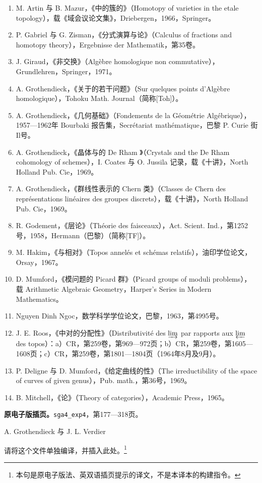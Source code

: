 \begin{enumerate}
\item[{[1]}] M. Artin 与 B. Mazur，《中的簇的》（Homotopy of varieties in the etale topology），载《域会议论文集》，Driebergen，1966，Springer。
\item[{[2]}] P. Gabriel 与 G. Zisman，《分式演算与论》（Calculus of fractions and homotopy theory），Ergebnisse der Mathematik，第35卷。
\item[{[3]}] J. Giraud，《非交换》（Algèbre homologique non commutative），Grundlehren，Springer，1971。
\item[{[4]}] A. Grothendieck，《关于的若干问题》（Sur quelques points d’Algèbre homologique），Tohoku Math. Journal（简称[Toh]）。
\item[{[5]}] A. Grothendieck，《几何基础》（Fondements de la Géométrie Algébrique），1957—1962年 Bourbaki 报告集，Secrétariat mathématique，巴黎 P. Curie 街Il号。
\item[{[6]}] A. Grothendieck，《晶体与的 De Rham 》（Crystals and the De Rham cohomology of schemes），I. Coates 与 O. Jussila 记录，载《十讲》，North Holland Pub. Cie，1969。
\item[{[7]}] A. Grothendieck，《群线性表示的 Chern 类》（Classes de Chern des représentations linéaires des groupes discrets），载《十讲》，North Holland Pub. Cie，1969。
\item[{[8]}] R. Godement，《层论》（Théorie des faisceaux），Act. Scient. Ind.，第1252号，1958，Hermann（巴黎）（简称[TF]）。
\item[{[9]}] M. Hakim，《与相对》（Topos annelés et schémas relatifs），油印学位论文，Orsay，1967。
\item[{[10]}] D. Mumford，《模问题的 Picard 群》（Picard groups of moduli problems），载 Arithmetic Algebraic Geometry，Harper’s Series in Modern Mathematics。
\item[{[11]}] Nguyen Dinh Ngoc，数学科学学位论文，巴黎，1963，第4995号。
\item[{[12]}] J. E. Roos，《中对的分配性》（Distributivité des $\varinjlim$ par rapports aux $\varprojlim$ des topos）：a）CR，第259卷，第969—972页；b）CR，第259卷，第1605—1608页；c）CR，第259卷，第1801—1804页（1964年8月及9月）。
\item[{[13]}] P. Deligne 与 D. Mumford，《给定曲线的性》（The irreductibility of the space of curves of given genus），Pub. math.，第36号，1969。
\item[{[14]}] B. Mitchell，《论》（Theory of categories），Academic Press，1965。
\end{enumerate}
\textbf{原电子版插页。}\texttt{sga4\_exp4}，第177—318页。\par
\textbf{}\par
A. Grothendieck 与 J. L. Verdier\par
请将这个文件单独编译，并插入此处。\footnote{本句是原电子版法、英双语插页提示的译文，不是本译本的构建指令。}
